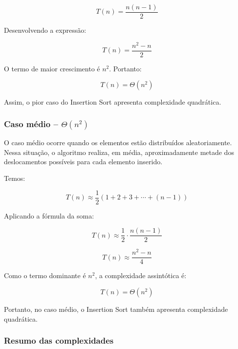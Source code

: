 \begin{equation}
T(n) = \frac{n(n-1)}{2}
\end{equation}

Desenvolvendo a expressão:

\begin{equation}
T(n) = \frac{n^2-n}{2}
\end{equation}

O termo de maior crescimento é $n^2$. Portanto:

\begin{equation}
T(n) = \Theta(n^2)
\end{equation}

Assim, o pior caso do Insertion Sort apresenta complexidade quadrática.

\subsubsection{Caso médio -- \texorpdfstring{$\Theta(n^2)$}{Theta(n²)}}

O caso médio ocorre quando os elementos estão distribuídos aleatoriamente.
Nessa situação, o algoritmo realiza, em média, aproximadamente metade dos
deslocamentos possíveis para cada elemento inserido.

Temos:

\begin{equation}
T(n) \approx \frac{1}{2}
\left(1+2+3+\cdots+(n-1)\right)
\end{equation}

Aplicando a fórmula da soma:

\begin{equation}
T(n) \approx \frac{1}{2}
\cdot\frac{n(n-1)}{2}
\end{equation}

\begin{equation}
T(n) \approx \frac{n^2-n}{4}
\end{equation}

Como o termo dominante é $n^2$, a complexidade assintótica é:

\begin{equation}
T(n) = \Theta(n^2)
\end{equation}

Portanto, no caso médio, o Insertion Sort também apresenta complexidade
quadrática.

\subsubsection{Resumo das complexidades}

